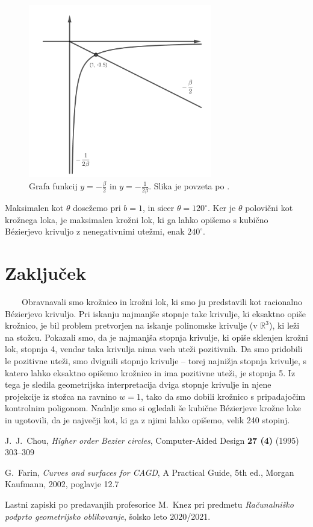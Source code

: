 \documentclass[a4paper,11pt]{article}
\theoremstyle{definition}
\theoremstyle{plain}
\begin{document}
\begin{figure}[ht!]
    \centering
    \includegraphics[width=80mm]{graf.png}
    \caption{Grafa funkcij $y=-\frac{\beta}{2}$ in $y=-\frac{1}{2\beta}$. Slika je povzeta po \cite{chou}.}
    \label{slika:graf}
\end{figure}

Maksimalen kot $\theta$ dosežemo pri $b=1$, in sicer $\theta=120^{\circ}$. Ker je $\theta$ polovični kot krožnega loka, je maksimalen krožni lok, ki ga lahko opišemo s kubično B\'ezierjevo krivuljo z nenegativnimi utežmi, enak $240^{\circ}$.


\section{Zaključek}
\ \ \ \
Obravnavali smo krožnico in krožni lok, ki smo ju predstavili kot racionalno B\'ezierjevo krivuljo.
Pri iskanju najmanjše stopnje take krivulje, ki eksaktno opiše krožnico, je bil problem pretvorjen na iskanje polinomske krivulje (v $\mathbb{R}^3$), ki leži na stožcu.
Pokazali smo, da je najmanjša stopnja krivulje, ki opiše sklenjen krožni lok, stopnja 4, vendar taka krivulja nima vseh uteži pozitivnih. 
Da smo pridobili le pozitivne uteži, smo dvignili stopnjo krivulje -- torej najnižja stopnja krivulje, s katero lahko eksaktno opišemo krožnico in ima pozitivne uteži, je stopnja 5. 
Iz tega je sledila geometrijska interpretacija dviga stopnje krivulje in njene projekcije iz stožca na ravnino $w = 1$, tako da smo dobili krožnico s pripadajočim kontrolnim poligonom.
Nadalje smo si ogledali še kubične B\'ezierjeve krožne loke in ugotovili, da je največji kot, ki ga z njimi lahko opišemo, velik 240 stopinj.


\begin{thebibliography}{99}
J.~J.~Chou, \emph{Higher order Bezier circles}, Computer-Aided Design \textbf{27 (4)} (1995) 303--309

G.~Farin, \emph{Curves and surfaces for CAGD}, A Practical Guide, 5th ed., Morgan Kaufmann, 2002, poglavje 12.7

Lastni zapiski po predavanjih profesorice M.~Knez pri predmetu \emph{Računalniško podprto geometrijsko oblikovanje}, šolsko leto 2020/2021.
\end{thebibliography}
\end{document}

